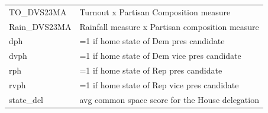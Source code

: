 \documentclass[]{book}
\begin{document}
\begin{longtable}[]{@{}ll@{}}
\begin{minipage}[t]{0.05\columnwidth}\raggedright\strut
TO\_DVS23MA\strut
\end{minipage} & \begin{minipage}[t]{0.89\columnwidth}\raggedright\strut
Turnout x Partisan Composition measure\strut
\end{minipage}\tabularnewline
\begin{minipage}[t]{0.05\columnwidth}\raggedright\strut
Rain\_DVS23MA\strut
\end{minipage} & \begin{minipage}[t]{0.89\columnwidth}\raggedright\strut
Rainfall measure x Partisan composition measure\strut
\end{minipage}\tabularnewline
\begin{minipage}[t]{0.05\columnwidth}\raggedright\strut
dph\strut
\end{minipage} & \begin{minipage}[t]{0.89\columnwidth}\raggedright\strut
=1 if home state of Dem pres candidate\strut
\end{minipage}\tabularnewline
\begin{minipage}[t]{0.05\columnwidth}\raggedright\strut
dvph\strut
\end{minipage} & \begin{minipage}[t]{0.89\columnwidth}\raggedright\strut
=1 if home state of Dem vice pres candidate\strut
\end{minipage}\tabularnewline
\begin{minipage}[t]{0.05\columnwidth}\raggedright\strut
rph\strut
\end{minipage} & \begin{minipage}[t]{0.89\columnwidth}\raggedright\strut
=1 if home state of Rep pres candidate\strut
\end{minipage}\tabularnewline
\begin{minipage}[t]{0.05\columnwidth}\raggedright\strut
rvph\strut
\end{minipage} & \begin{minipage}[t]{0.89\columnwidth}\raggedright\strut
=1 if home state of Rep vice pres candidate\strut
\end{minipage}\tabularnewline
\begin{minipage}[t]{0.05\columnwidth}\raggedright\strut
state\_del\strut
\end{minipage} & \begin{minipage}[t]{0.89\columnwidth}\raggedright\strut
avg common space score for the House delegation\strut

\end{minipage}
\end{longtable}
\end{document}
